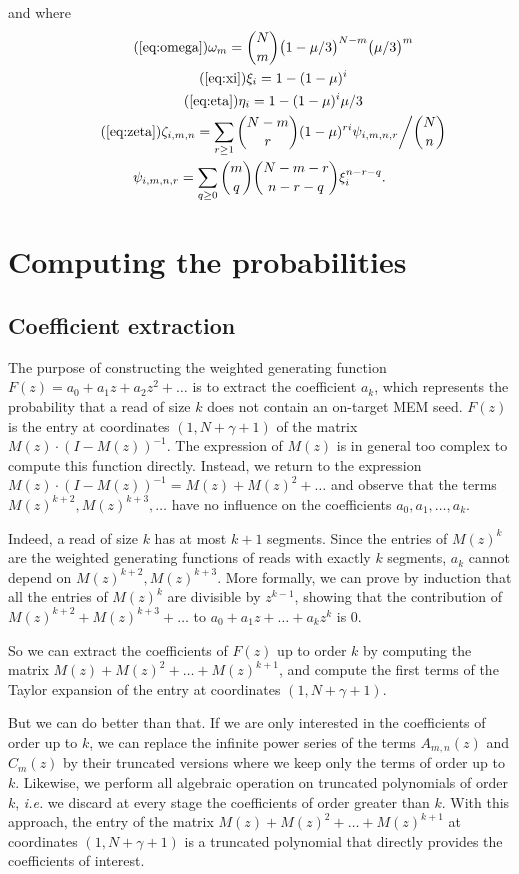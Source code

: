 \documentclass{article}
\begin{document}
and where
\begin{gather}
\tag{\ref{eq:omega}}
\omega_m = {N \choose m} \big(1 - \mu/3\big)^{N-m} \big(\mu/3\big)^m \\
\tag{\ref{eq:xi}}
\xi_i = 1-(1-\mu)^i \\
\tag{\ref{eq:eta}}
\eta_i = 1-(1-\mu)^i\mu/3 \\
\tag{\ref{eq:zeta}}
\zeta_{i,m,n} = \sum_{r\geq1} {N-m \choose r}
(1-\mu)^{ri} \psi_{i,m,n,r} \bigg/ {N \choose n} \\
\notag
\psi_{i,m,n,r} = \sum_{q \geq 0}{m \choose q}{N-m-r \choose n-r-q}
\xi_i^{n-r-q}.
\end{gather}


\section{Computing the probabilities}

\subsection{Coefficient extraction}

The purpose of constructing the weighted generating function $F(z) = a_0 +
a_1z + a_2z^2 + \ldots$ is to extract the coefficient $a_k$, which
represents the probability that a read of size $k$ does not contain an
on-target MEM seed. $F(z)$ is the entry at coordinates $(1,N+\gamma+1)$ of
the matrix $M(z) \cdot (I-M(z))^{-1}$. The expression of $M(z)$ is in
general too complex to compute this function directly. Instead, we return
to the expression $M(z) \cdot (I-M(z))^{-1} = M(z) + M(z)^2 + \ldots$ and
observe that the terms $M(z)^{k+2}, M(z)^{k+3}, \ldots$ have no influence
on the coefficients $a_0, a_1, \ldots, a_k$.

Indeed, a read of size $k$ has at most $k+1$ segments. Since the entries
of $M(z)^k$ are the weighted generating functions of reads with exactly
$k$ segments, $a_k$ cannot depend on $M(z)^{k+2}, M(z)^{k+3}$. More
formally, we can prove by induction that all the entries of $M(z)^k$ are
divisible by $z^{k-1}$, showing that the contribution of $M(z)^{k+2} +
M(z)^{k+3} + \ldots$ to $a_0 + a_1z + \ldots +a_kz^k$ is $0$.

So we can extract the coefficients of $F(z)$ up to order $k$ by computing
the matrix $M(z) + M(z)^2 + \ldots + M(z)^{k+1}$, and compute the first
terms of the Taylor expansion of the entry at coordinates
$(1,N+\gamma+1)$.

But we can do better than that. If we are only interested in the
coefficients of order up to $k$, we can replace the infinite power series
of the terms $A_{m,n}(z)$ and $C_m(z)$ by their truncated versions where
we keep only the terms of order up to $k$. Likewise, we perform all
algebraic operation on truncated polynomials of order $k$, \textit{i.e.}
we discard at every stage the coefficients of order greater than $k$. With
this approach, the entry of the matrix $M(z) + M(z)^2 + \ldots +
M(z)^{k+1}$ at coordinates $(1,N+\gamma+1)$ is a truncated polynomial that
directly provides the coefficients of interest.
\end{document}
